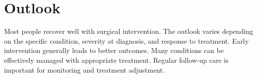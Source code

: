 \section{Outlook}
Most people recover well with surgical intervention. The outlook varies depending on the specific condition, severity at diagnosis, and response to treatment. Early intervention generally leads to better outcomes. Many conditions can be effectively managed with appropriate treatment. Regular follow-up care is important for monitoring and treatment adjustment.
